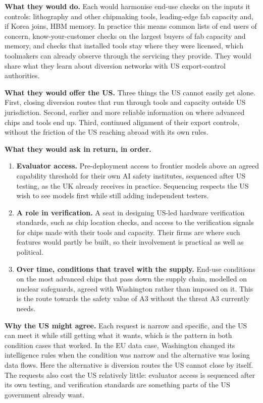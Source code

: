 \documentclass[11pt]{article}
\begin{document}
\textbf{What they would do.} Each would harmonise end-use checks on the inputs it controls: lithography and other chipmaking tools, leading-edge fab capacity and, if Korea joins, HBM memory. In practice this means common lists of end users of concern, know-your-customer checks on the largest buyers of fab capacity and memory, and checks that installed tools stay where they were licensed, which toolmakers can already observe through the servicing they provide. They would share what they learn about diversion networks with US export-control authorities.

\textbf{What they would offer the US.} Three things the US cannot easily get alone. First, closing diversion routes that run through tools and capacity outside US jurisdiction. Second, earlier and more reliable information on where advanced chips and tools end up. Third, continued alignment of their export controls, without the friction of the US reaching abroad with its own rules.

\textbf{What they would ask in return, in order.}
\begin{enumerate}[leftmargin=*]
\item \textbf{Evaluator access.} Pre-deployment access to frontier models above an agreed capability threshold for their own AI safety institutes, sequenced after US testing, as the UK already receives in practice. Sequencing respects the US wish to see models first while still adding independent testers.
\item \textbf{A role in verification.} A seat in designing US-led hardware verification standards, such as chip location checks, and access to the verification signals for chips made with their tools and capacity. Their firms are where such features would partly be built, so their involvement is practical as well as political.
\item \textbf{Over time, conditions that travel with the supply.} End-use conditions on the most advanced chips that pass down the supply chain, modelled on nuclear safeguards, agreed with Washington rather than imposed on it. This is the route towards the safety value of A3 without the threat A3 currently needs.
\end{enumerate}

\textbf{Why the US might agree.} Each request is narrow and specific, and the US can meet it while still getting what it wants, which is the pattern in both condition cases that worked. In the EU data case, Washington changed its intelligence rules when the condition was narrow and the alternative was losing data flows. Here the alternative is diversion routes the US cannot close by itself. The requests also cost the US relatively little: evaluator access is sequenced after its own testing, and verification standards are something parts of the US government already want.
\end{document}
